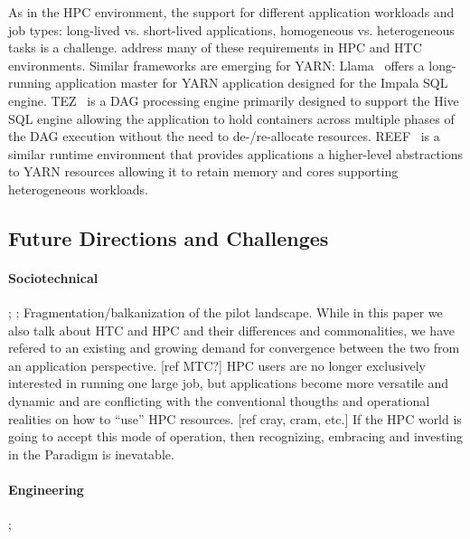 \documentclass{sig-alternate}
\begin{document}
As in the HPC environment, the support for different application
workloads and job types: long-lived vs. short-lived applications,
homogeneous vs. heterogeneous tasks is a challenge. \pilots address many
of these requirements in HPC and HTC environments. Similar frameworks
are emerging for YARN: Llama~\cite{llama} offers a long-running
application master for YARN application designed for the Impala SQL
engine. TEZ~\cite{tez} is a DAG processing engine primarily designed to
support the Hive SQL engine allowing the application to hold containers
across multiple phases of the DAG execution without the need to
de-/re-allocate resources. REEF~\cite{Chun:2013:RRE:2536274.2536318} is
a similar runtime environment that provides applications a higher-level
abstractions to YARN resources allowing it to retain memory and cores
supporting heterogeneous workloads.

\subsection{Future Directions and Challenges}
\label{sec:5.3}

\paragraph*{Sociotechnical} ;
; Fragmentation/balkanization of
the pilot landscape.
While in this paper we also talk about HTC and HPC and their differences and
commonalities, we have refered to an existing and growing demand for
convergence between the two from an application perspective.
[ref MTC?]
HPC users are no longer exclusively interested in running one large job, but
applications become more versatile and dynamic and are conflicting with the
conventional thougths and operational realities on how to ``use'' HPC
resources. [ref cray, cram, etc.]
If the HPC world is going to accept this mode of operation, then recognizing,
embracing and investing in the \pilot Paradigm is inevatable.

\paragraph*{Engineering} ; 
\end{document}
